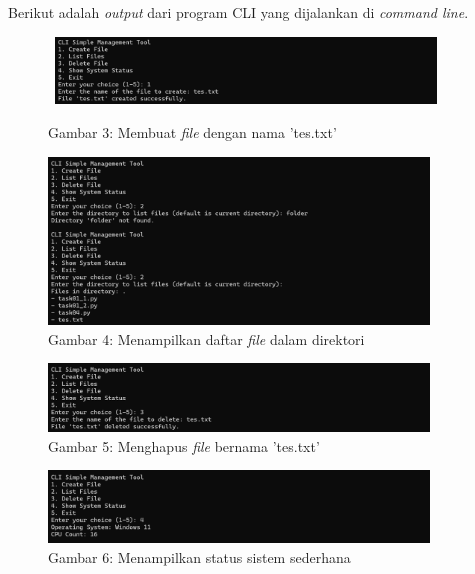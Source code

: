 \documentclass[12pt]{article}
\begin{document}
        \noindent Berikut adalah \textit{output} dari program CLI yang dijalankan di \textit{command line}.
        \begin{figure}[h]
            \centering\
            \includegraphics[width=0.9\textwidth]{asset/a4-output-1.png}
                        \caption{Gambar 3: Membuat \textit{file} dengan nama 'tes.txt'}
            \label{fig:a4-output-1}
        \end{figure}
        \begin{figure}[h]
            \centering
            \includegraphics[width=0.9\textwidth]{asset/a4-output-2.png}
                        \caption{Gambar 4: Menampilkan daftar \textit{file} dalam direktori}
            \label{fig:a4-output-2}
        \end{figure}
        \begin{figure}[h]
            \centering
            \includegraphics[width=0.9\textwidth]{asset/a4-output-3.png}
                        \caption{Gambar 5: Menghapus \textit{file} bernama 'tes.txt'}
            \label{fig:a4-output-3}
        \end{figure}
        \begin{figure}[h]
            \centering
            \includegraphics[width=0.9\textwidth]{asset/a4-output-4.png}
                        \caption{Gambar 6: Menampilkan status sistem sederhana}
            \label{fig:a4-output-4}
        \end{figure}
\end{document}

